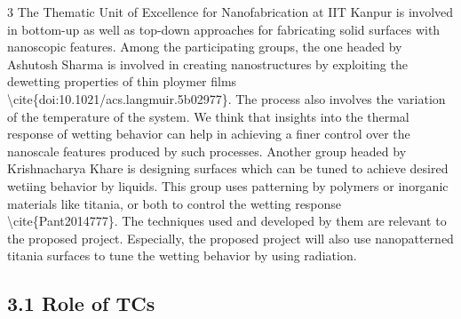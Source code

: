 \par 3 The Thematic Unit of Excellence for Nanofabrication at IIT Kanpur is involved in bottom-up as well as top-down approaches for fabricating solid surfaces with nanoscopic features. Among the participating groups, the one headed by Ashutosh Sharma is involved in creating nanostructures by exploiting the dewetting properties of thin ploymer films \textbackslash cite\{doi:10.1021/acs.langmuir.5b02977\}. The process also involves the variation of the temperature of the system. We think that insights into the thermal response of wetting behavior can help in achieving a finer control over the nanoscale features produced by such processes. Another group headed by Krishnacharya Khare is designing surfaces which can be tuned to achieve desired wetiing behavior by liquids. This group uses patterning by polymers or inorganic materials like titania, or both to control the wetting response \textbackslash cite\{Pant2014777\}. The techniques used and developed by them are relevant to the proposed project. Especially, the proposed project will also use nanopatterned titania surfaces to tune the wetting behavior by using radiation.\subsection{3.1 Role of TCs}

